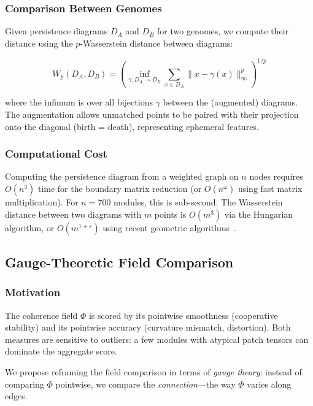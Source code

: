 \documentclass{../yalumba}
\begin{document}
\subsubsection{Comparison Between Genomes}

Given persistence diagrams $D_A$ and $D_B$ for two genomes, we compute
their distance using the $p$-Wasserstein distance between diagrams:

\begin{equation}
  W_p(D_A, D_B) = \left(\inf_{\gamma: D_A \to D_B}
  \sum_{x \in D_A} \|x - \gamma(x)\|_\infty^p \right)^{1/p}
  \label{eq:wasserstein_diagram}
\end{equation}

where the infimum is over all bijections $\gamma$ between the (augmented)
diagrams.  The augmentation allows unmatched points to be paired with
their projection onto the diagonal (birth = death), representing
ephemeral features.

\subsubsection{Computational Cost}

Computing the persistence diagram from a weighted graph on $n$ nodes
requires $O(n^3)$ time for the boundary matrix reduction (or
$O(n^\omega)$ using fast matrix multiplication).  For $n = 700$ modules,
this is sub-second.  The Wasserstein distance between two diagrams with
$m$ points is $O(m^3)$ via the Hungarian algorithm, or
$O(m^{1+\varepsilon})$ using recent geometric
algorithms~\cite{kerber2017geometry}.

\subsection{Gauge-Theoretic Field Comparison}
\label{sec:directions:gauge}

\subsubsection{Motivation}

The coherence field $\Phi$ is scored by its pointwise smoothness
(cooperative stability) and its pointwise accuracy (curvature mismatch,
distortion).  Both measures are sensitive to outliers: a few modules
with atypical patch tensors can dominate the aggregate score.

We propose reframing the field comparison in terms of \emph{gauge
theory}: instead of comparing $\Phi$ pointwise, we compare the
\emph{connection}---the way $\Phi$ varies along edges.
\end{document}
